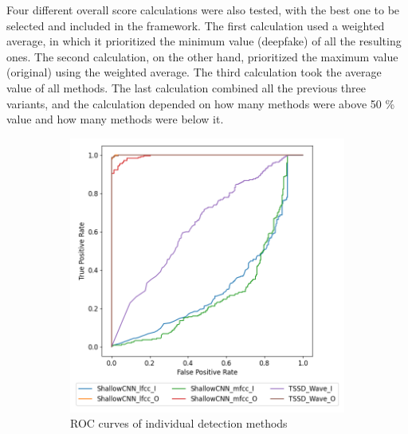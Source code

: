 Four different overall score calculations were also tested, with the best one to be selected and included in the framework. The first calculation used a weighted average, in which it prioritized the minimum value (deepfake) of all the resulting ones. The second calculation, on the other hand, prioritized the maximum value (original) using the weighted average. The third calculation took the average value of all methods. The last calculation combined all the previous three variants, and the calculation depended on how many methods were above 50 \% value and how many methods were below it.

\begin{figure}[H]
    \begin{subfigure}[h]{0.5\linewidth}
        \centering
        \includegraphics[width=1\linewidth]{other-fig/tests/lj_wf_methods.png}
        \caption{ROC curves of individual detection methods}
    \end{subfigure}
    \hfill
    \begin{subfigure}[h]{0.5\linewidth}
        \centering

\end{subfigure}
\end{figure}
